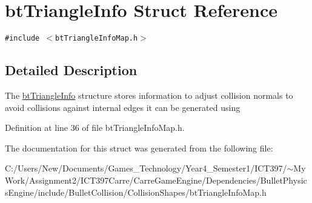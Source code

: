 \hypertarget{structbt_triangle_info}{
\section{btTriangleInfo Struct Reference}
\label{structbt_triangle_info}
}
{\tt \#include $<$btTriangleInfoMap.h$>$}



\subsection{Detailed Description}
The \hyperlink{structbt_triangle_info}{btTriangleInfo} structure stores information to adjust collision normals to avoid collisions against internal edges it can be generated using 

Definition at line 36 of file btTriangleInfoMap.h.

The documentation for this struct was generated from the following file:\begin{CompactItemize}
\item 
C:/Users/New/Documents/Games\_\-Technology/Year4\_\-Semester1/ICT397/$\sim$My Work/Assignment2/ICT397Carre/CarreGameEngine/Dependencies/BulletPhysicsEngine/include/BulletCollision/CollisionShapes/btTriangleInfoMap.h\end{CompactItemize}
